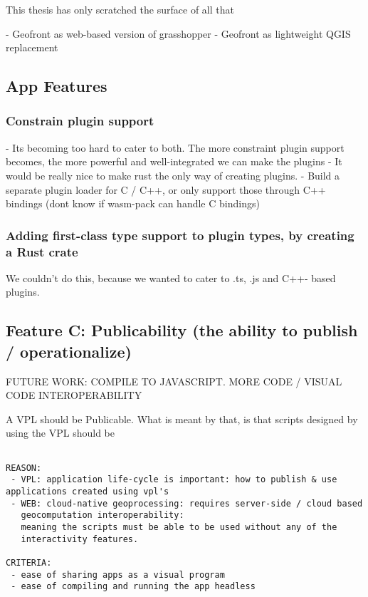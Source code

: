 This thesis has only scratched the surface of all that

- Geofront as web-based version of grasshopper
- Geofront as lightweight QGIS replacement 





\subsection{App Features}

\subsubsection{ Constrain plugin support}
- Its becoming too hard to cater to both. The more constraint plugin support becomes, the more powerful and well-integrated we can make the plugins
- It would be really nice to make rust the only way of creating plugins. 
- Build a separate plugin loader for C / C++, or only support those through C++ bindings (dont know if wasm-pack can handle C bindings)


\subsubsection{Adding first-class type support to plugin types, by creating a Rust crate }
We couldn't do this, because we wanted to cater to .ts, .js and C++- based plugins.




\subsection*{Feature C: Publicability (the ability to publish / operationalize) } 
FUTURE WORK: COMPILE TO JAVASCRIPT. MORE CODE / VISUAL CODE INTEROPERABILITY

A VPL should be Publicable. What is meant by that, is that scripts designed by using the VPL should be 

\begin{lstlisting}

REASON: 
 - VPL: application life-cycle is important: how to publish & use applications created using vpl's
 - WEB: cloud-native geoprocessing: requires server-side / cloud based
   geocomputation interoperability: 
   meaning the scripts must be able to be used without any of the 
   interactivity features.

CRITERIA:
 - ease of sharing apps as a visual program
 - ease of compiling and running the app headless
\end{lstlisting}





